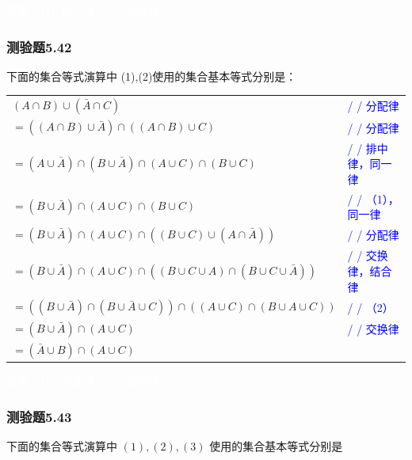 \documentclass[UTF8, heading=true]{ctexart}
\begin{document}
\textcolor{white}{答案：（1）排中律 （2）吸收律}

\subsubsection{测验题5.42}

下面的集合等式演算中 (1),(2)使用的集合基本等式分别是：


\begin{table}[H]
  \centering
  \renewcommand{\arraystretch}{1.5}
  \begin{tabular}{ll}
    $(A \cap B) \cup (\bar{A} \cap C)$ & \textcolor{blue}{/ / 分配律} \\
    $=((A \cap B) \cup \bar{A}) \cap ((A \cap B) \cup C)$ & \textcolor{blue}{/ / 分配律} \\
    $=(A \cup \bar{A}) \cap (B \cup \bar{A}) \cap (A \cup C) \cap (B \cup C)$ & \textcolor{blue}{/ / 排中律，同一律} \\
    $=(B \cup \bar{A}) \cap (A \cup C) \cap (B \cup C)$ & \textcolor{blue}{/ / （1），同一律} \\
    $=(B \cup \bar{A}) \cap (A \cup C) \cap ((B \cup C) \cup (A \cap \bar{A}))$ & \textcolor{blue}{/ / 分配律} \\
    $=(B \cup \bar{A}) \cap (A \cup C) \cap ((B \cup C \cup A) \cap (B \cup C \cup \bar{A}))$ & \textcolor{blue}{/ / 交换律，结合律} \\
    $=((B \cup \bar{A}) \cap (B \cup \bar{A} \cup C)) \cap ((A \cup C) \cap (B \cup A \cup C))$ & \textcolor{blue}{/ / （2）} \\
    $=(B \cup \bar{A}) \cap (A \cup C)$ & \textcolor{blue}{/ / 交换律} \\
    $=(\bar{A} \cup B) \cap (A \cup C)$ &  \\
  \end{tabular}
\end{table}


\textcolor{white}
{
  答案：（1）矛盾律
  （2）吸收律
}


\subsubsection{测验题5.43}

下面的集合等式演算中 $(1),(2),(3)$ 使用的集合基本等式分别是
\end{document}
